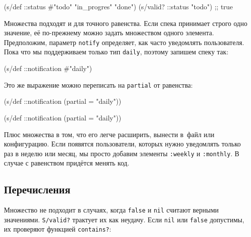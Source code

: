 \else

\begin{english}
  \begin{clojure}
(s/def ::status #{"todo" "in_progres" "done"})
(s/valid? ::status "todo") ;; true
  \end{clojure}
\end{english}

\fi

Множества подходят и для точного равенства. Если спека принимает строго одно
значение, её по-прежнему можно задать множеством одного
элемента. Предположим, параметр \verb|notify| определяет, как часто уведомлять
пользователя. Пока что мы поддерживаем только тип \verb|daily|, поэтому
запишем спеку так:

\begin{english}
  \begin{clojure}
(s/def ::notification #{"daily"})
  \end{clojure}
\end{english}

\noindent
Это же выражение можно переписать на \verb|partial| от равенства:

\ifx\DEVICETYPE\MOBILE

\begin{english}
  \begin{clojure}
(s/def ::notification
  (partial = "daily"))
  \end{clojure}
\end{english}

\else

\begin{english}
  \begin{clojure}
(s/def ::notification (partial = "daily"))
  \end{clojure}
\end{english}

\fi

Плюс множества в том, что его легче расширить, вынести в~файл или
конфигурацию. Если появятся пользователи, которых нужно уведомлять только раз в
неделю или месяц, мы просто добавим элементы \verb|:weekly| и \verb|:monthly|. В
случае с равенством придётся менять код.

\subsection{Перечисления}


Множество не подходит в случаях, когда \verb|false| и \verb|nil| считают
верными значениями. \verb|S/valid?| трактует их как неудачу. Если \verb|nil|
или \verb|false| допустимы, их проверяют функцией \verb|contains?|:


